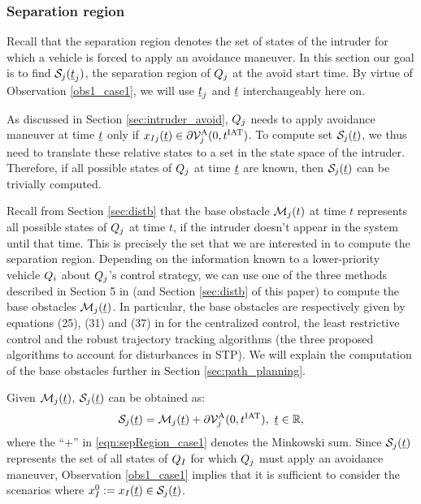 \subsubsection{Separation region} \label{sec:sepRegion_case1}
Recall that the separation region denotes the set of states of the intruder for which a vehicle is forced to apply an avoidance maneuver. In this section our goal is to find $\mathcal{S}_j(\underline{t}_j)$, the separation region of $Q_j$ at the avoid start time. By virtue of Observation \ref{obs1_case1}, we will use $\underline{t}_j$ and $\underline{t}$ interchangeably here on.
%

As discussed in Section \ref{sec:intruder_avoid}, $Q_j$ needs to apply avoidance maneuver at time $\underline{t}$ only if $x_{I j}(\underline{t}) \in \partial \mathcal{V}^{\text{A}}_{j}(0, t^\text{IAT})$. To compute set $\mathcal{S}_j(\underline{t})$, we thus need to translate these relative states to a set in the state space of the intruder. Therefore, if all possible states of $Q_j$ at time $\underline{t}$ are known, then $\mathcal{S}_j(\underline{t})$ can be trivially computed.

Recall from Section \ref{sec:distb} that the base obstacle $\mathcal{M}_j(t)$ at time $t$ represents all possible states of $Q_j$ at time $t$, if the intruder doesn't appear in the system until that time. This is precisely the set that we are interested in to compute the separation region.
%
Depending on the information known to a lower-priority vehicle $Q_i$ about $Q_j$'s control strategy, we can use one of the three methods described in Section 5 in \cite{chen2016robust} (and Section \ref{sec:distb} of this paper) to compute the base obstacles $\mathcal{M}_j(\underline{t})$. In particular, the base obstacles are respectively given by equations (25), (31) and (37) in \cite{chen2016robust} for the centralized control, the least restrictive control and the robust trajectory tracking algorithms (the three proposed algorithms to account for disturbances in STP). We will explain the computation of the base obstacles further in Section \ref{sec:path_planning}.

Given $\mathcal{M}_j(\underline{t})$, $\mathcal{S}_j(\underline{t})$ can be obtained as:
\begin{equation} \label{eqn:sepRegion_case1}
\sep_j(\tsa) = \boset_j(\tsa) + \partial \brs^{\text{A}}_{j}(0, \iat), ~\tsa \in \R,
\end{equation}
where the ``$+$'' in \eqref{eqn:sepRegion_case1} denotes the Minkowski sum. Since $\mathcal{S}_j(\underline{t})$ represents the set of all states of $Q_I$ for which $Q_j$ must apply an avoidance maneuver, Observation \ref{obs1_case1} implies that it is sufficient to consider the scenarios where $x_{I}^0 := x_{I}(\underline{t}) \in \mathcal{S}_j(\underline{t})$.